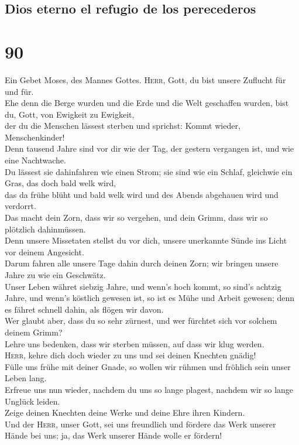 \hypertarget{dios-eterno-el-refugio-de-los-perecederos}{%
\subsection{Dios eterno el refugio de los
perecederos}\label{dios-eterno-el-refugio-de-los-perecederos}}

\hypertarget{section-89}{%
\section{90}\label{section-89}}

 Ein Gebet Moses, des Mannes Gottes. \textsc{Herr}, Gott,
du bist unsere Zuflucht für und für.\\
 Ehe denn die Berge wurden und die Erde und die Welt
geschaffen wurden, bist du, Gott, von Ewigkeit zu Ewigkeit,\\
 der du die Menschen lässest sterben und sprichst: Kommt
wieder, Menschenkinder!\\
 Denn tausend Jahre sind vor dir wie der Tag, der gestern
vergangen ist, und wie eine Nachtwache.\\
 Du lässest sie dahinfahren wie einen Strom; sie sind wie
ein Schlaf, gleichwie ein Gras, das doch bald welk wird,\\
 das da frühe blüht und bald welk wird und des Abends
abgehauen wird und verdorrt.\\
 Das macht dein Zorn, dass wir so vergehen, und dein
Grimm, dass wir so plötzlich dahinmüssen.\\
 Denn unsere Missetaten stellst du vor dich, unsere
unerkannte Sünde ins Licht vor deinem Angesicht.\\
 Darum fahren alle unsere Tage dahin durch deinen Zorn;
wir bringen unsere Jahre zu wie ein Geschwätz.\\
 Unser Leben währet siebzig Jahre, und wenn's hoch kommt,
so sind's achtzig Jahre, und wenn's köstlich gewesen ist, so ist es Mühe
und Arbeit gewesen; denn es fähret schnell dahin, als flögen wir
davon.\\
 Wer glaubt aber, dass du so sehr zürnest, und wer
fürchtet sich vor solchem deinem Grimm?\\
 Lehre uns bedenken, dass wir sterben müssen, auf dass
wir klug werden.\\
 \textsc{Herr}, kehre dich doch wieder zu uns und sei
deinen Knechten gnädig!\\
 Fülle uns frühe mit deiner Gnade, so wollen wir rühmen
und fröhlich sein unser Leben lang.\\
 Erfreue uns nun wieder, nachdem du uns so lange plagest,
nachdem wir so lange Unglück leiden.\\
 Zeige deinen Knechten deine Werke und deine Ehre ihren
Kindern.\\
 Und der \textsc{Herr}, unser Gott, sei uns freundlich
und fördere das Werk unserer Hände bei uns; ja, das Werk unserer Hände
wolle er fördern!

